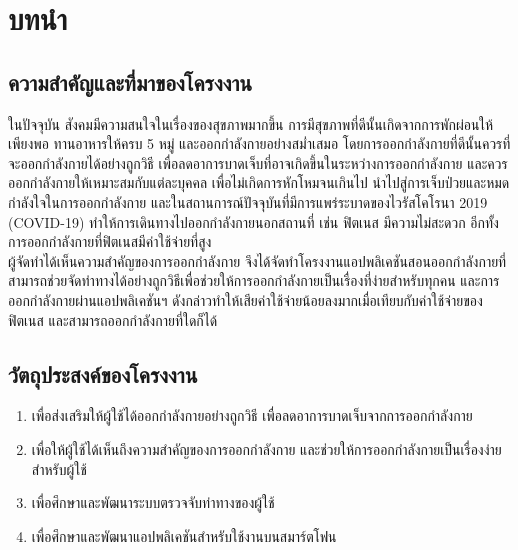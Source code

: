 \chapter{บทนำ}
\section{ความสำคัญและที่มาของโครงงาน}
\indent
ในปัจจุบัน สังคมมีความสนใจในเรื่องของสุขภาพมากขึ้น การมีสุขภาพที่ดีนั้นเกิดจากการพักผ่อนให้เพียงพอ 
ทานอาหารให้ครบ 5 หมู่ และออกกำลังกายอย่างสม่ำเสมอ  โดยการออกกำลังกายที่ดีนั้นควรที่จะออกกำลังกายได้อย่างถูกวิธี เพื่อลดอาการบาดเจ็บที่อาจเกิดขึ้นในระหว่างการออกกำลังกาย 
และควรออกกำลังกายให้เหมาะสมกับแต่ละบุคคล เพื่อไม่เกิดการหักโหมจนเกินไป นำไปสู่การเจ็บป่วยและหมดกำลังใจในการออกกำลังกาย  
และในสถานการณ์ปัจจุบันที่มีการแพร่ระบาดของไวรัสโคโรนา 2019 (COVID-19) ทำให้การเดินทางไปออกกำลังกายนอกสถานที่ เช่น ฟิตเนส มีความไม่สะดวก อีกทั้งการออกกำลังกายที่ฟิตเนสมีค่าใช้จ่ายที่สูง
\\\indent
ผู้จัดทำได้เห็นความสำคัญของการออกกำลังกาย จึงได้จัดทำโครงงานแอปพลิเคชันสอนออกกำลังกายที่สามารถช่วยจัดท่าทางได้อย่างถูกวิธีเพื่อช่วยให้การออกกำลังกายเป็นเรื่องที่ง่ายสำหรับทุกคน  
และการออกกำลังกายผ่านแอปพลิเคชันฯ ดังกล่าวทำให้เสียค่าใช้จ่ายน้อยลงมากเมื่อเทียบกับค่าใช้จ่ายของฟิตเนส และสามารถออกกำลังกายที่ใดก็ได้

\section{วัตถุประสงค์ของโครงงาน}
\begin{enumerate}
    \item เพื่อส่งเสริมให้ผู้ใช้ได้ออกกำลังกายอย่างถูกวิธี เพื่อลดอาการบาดเจ็บจากการออกกำลังกาย
    \item เพื่อให้ผู้ใช้ได้เห็นถึงความสำคัญของการออกกำลังกาย และช่วยให้การออกกำลังกายเป็นเรื่องง่ายสำหรับผู้ใช้
    \item เพื่อศึกษาและพัฒนาระบบตรวจจับท่าทางของผู้ใช้
    \item เพื่อศึกษาและพัฒนาแอปพลิเคชันสำหรับใช้งานบนสมาร์ตโฟน
\end{enumerate}

